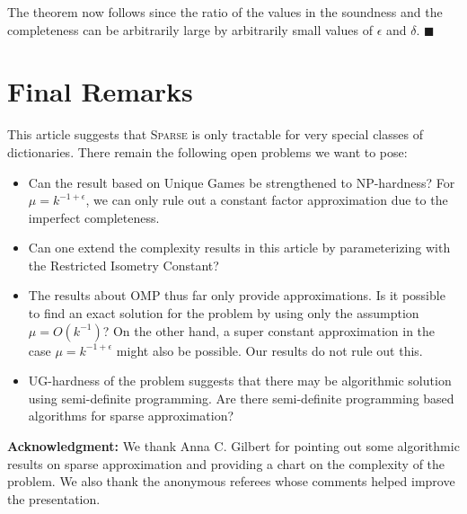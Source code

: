 \documentclass[11pt]{article}
\begin{document}
The theorem now follows since the ratio of the values in the soundness and
the completeness can be arbitrarily large by arbitrarily small values of
$\epsilon$ and $\delta$. \hfill $\blacksquare$

\section{Final Remarks}
This article suggests that \textsc{Sparse} is only tractable for
very special classes of dictionaries. There remain the following open
problems we want to pose:
\begin{itemize}
\item Can the result based on Unique Games be strengthened to
\textsf{NP}-hardness? For $\mu = k^{-1+\epsilon}$, we can only rule out
a constant factor approximation due to the imperfect completeness.

\item Can one extend the complexity results in this article by
parameterizing with the Restricted Isometry Constant?

\item The results about OMP thus far only provide approximations.
Is it possible to find an exact solution for the problem by using
only the assumption $\mu = O(k^{-1})$? On the other hand,
a super constant approximation in the case $\mu = k^{-1+\epsilon}$
might also be possible. Our results do not rule out this.

\item UG-hardness of the problem suggests that there may be algorithmic
solution using semi-definite programming. Are there semi-definite
programming based algorithms for sparse approximation?
\end{itemize}

\textbf{Acknowledgment:} We thank Anna C. Gilbert for pointing out
some algorithmic results on sparse approximation and providing a
chart on the complexity of the problem. We also thank the anonymous
referees whose comments helped improve the presentation.


{


}
\end{document}

